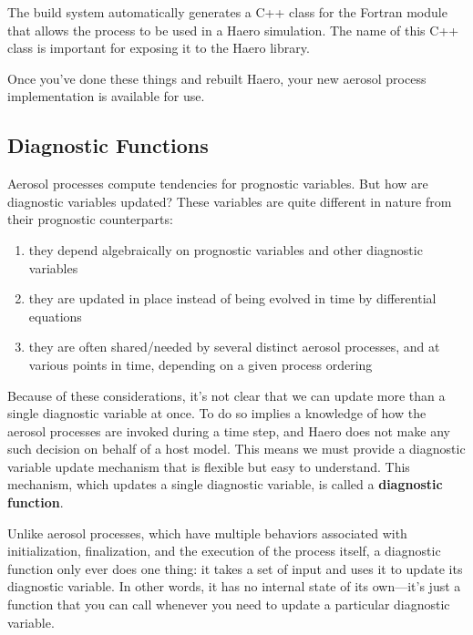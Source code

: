 The build system automatically generates a C++ class for the Fortran module that
allows the process to be used in a Haero simulation. The name of this C++ class
is important for exposing it to the Haero library.

Once you've done these things and rebuilt Haero, your new aerosol process
implementation is available for use.

\subsection{Diagnostic Functions}

Aerosol processes compute tendencies for prognostic variables. But how are
diagnostic variables updated? These variables are quite different in nature from
their prognostic counterparts:

\begin{enumerate}
  \item they depend algebraically on prognostic variables and other diagnostic
        variables
  \item they are updated in place instead of being evolved in time by
        differential equations
  \item they are often shared/needed by several distinct aerosol processes, and
        at various points in time, depending on a given process ordering
\end{enumerate}

Because of these considerations, it's not clear that we can update more than a
single diagnostic variable at once. To do so implies a knowledge of how the
aerosol processes are invoked during a time step, and Haero does not make any
such decision on behalf of a host model. This means we must provide a diagnostic
variable update mechanism that is flexible but easy to understand. This
mechanism, which updates a single diagnostic variable, is called a
{\bf diagnostic function}.

Unlike aerosol processes, which have multiple behaviors associated with
initialization, finalization, and the execution of the process itself, a
diagnostic function only ever does one thing: it takes a set of input and
uses it to update its diagnostic variable. In other words, it has no internal
state of its own---it's just a function that you can call whenever you need
to update a particular diagnostic variable.



